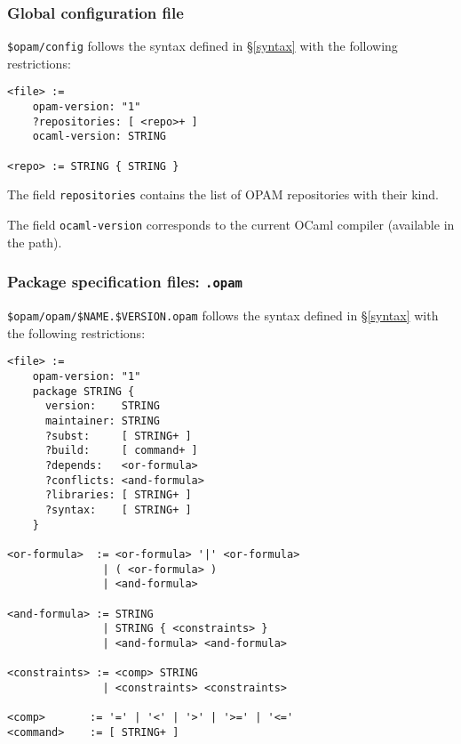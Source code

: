 \documentclass[a4paper,11pt]{article}
\begin{document}
\subsubsection{Global configuration file}
\label{config}

\verb+$opam/config+ follows the syntax defined in \S\ref{syntax} with
the following restrictions:

{\small
\begin{Verbatim}[frame=single]
<file> :=
    opam-version: "1"
    ?repositories: [ <repo>+ ]
    ocaml-version: STRING

<repo> := STRING { STRING }
\end{Verbatim}
}

The field {\tt repositories} contains the list of OPAM
repositories with their kind.

The field {\tt ocaml-version} corresponds to the current OCaml
compiler (available in the path).

\subsubsection{Package specification files: {\tt .opam}}
\label{dotopam}

\verb+$opam/opam/$NAME.$VERSION.opam+ follows the syntax defined in
\S\ref{syntax} with the following restrictions:

{\small
\begin{Verbatim}[frame=single]
<file> :=
    opam-version: "1"
    package STRING {
      version:    STRING
      maintainer: STRING
      ?subst:     [ STRING+ ]
      ?build:     [ command+ ]
      ?depends:   <or-formula>
      ?conflicts: <and-formula>
      ?libraries: [ STRING+ ]
      ?syntax:    [ STRING+ ]
    }

<or-formula>  := <or-formula> '|' <or-formula>
               | ( <or-formula> )
               | <and-formula>

<and-formula> := STRING
               | STRING { <constraints> }
               | <and-formula> <and-formula>

<constraints> := <comp> STRING
               | <constraints> <constraints>

<comp>       := '=' | '<' | '>' | '>=' | '<='
<command>    := [ STRING+ ]
\end{Verbatim}
}
\end{document}
